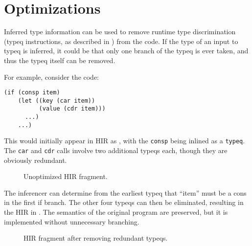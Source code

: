 \section{Optimizations}

Inferred type information can be used to remove runtime type
discrimination (typeq instructions, as described in )
from the code. If the type of an input to typeq is inferred, it could
be that only one branch of the typeq is ever taken, and thus the typeq
itself can be removed.

For example, consider the code:

\begin{verbatim}
(if (consp item)
    (let ((key (car item))
          (value (cdr item)))
      ...)
    ...)
\end{verbatim}

This would initially appear in HIR as ,
with the \texttt{consp} being inlined as a \texttt{typeq}. The
\texttt{car} and \texttt{cdr} calls involve two additional typeqs
each, though they are obviously redundant.

\begin{figure}
  \begin{center}
  \end{center}
  \caption{\label{fig-unoptimized}
    Unoptimized HIR fragment.}
\end{figure}

The inferencer can determine from the earliest typeq that ``item'' must
be a cons in the first if branch. The other four typeqs can then be
eliminated, resulting in the HIR in . The
semantics of the original program are preserved, but it is implemented
without unnecessary branching.

\begin{figure}
  \begin{center}
  \end{center}
  \caption{\label{fig-optimized}
    HIR fragment after removing redundant typeqs.}
\end{figure}
